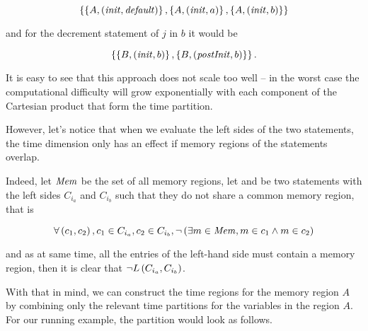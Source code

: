 \documentclass[..thesis.tex]{subfiles}
\begin{document}
\begin{equation*}
\left\lbrace \left\lbrace A, \left( \mathit{init}, \mathit{default} \right) \right\rbrace, \left\lbrace A, \left( \mathit{init}, a  \right) \right\rbrace, \left\lbrace A, \left( \mathit{init}, b \right) \right\rbrace \right\rbrace
\end{equation*}

and for the decrement statement of $j$ in $b$ it would be

\begin{equation*}
\left\lbrace \left\lbrace B, \left( \mathit{init}, b \right)  \right\rbrace, \left\lbrace B, \left( \mathit{postInit}, b \right) \right\rbrace \right\rbrace \text{.}
\end{equation*}


It is easy to see that this approach does not scale too well -- in the worst case the computational difficulty will grow exponentially
with each component of the Cartesian product that form the time partition.

However, let's notice that when we evaluate the left sides of the two statements, the time dimension only has an effect if memory regions of the statements overlap. 

Indeed, let $\mathit{Mem}$ be the set of all memory regions, let  and  be two statements with the left sides $C_{i_{a}}$ and $C_{i_{b}}$ such that they do not share a common memory region, that is

\begin{equation*}
\forall \left( c_1, c_2 \right), c_1 \in C_{i_a} , c_2 \in C_{i_b} , \lnot \left( \exists m \in \mathit{Mem},  m \in c_1 \land m \in c_2 \right)
\end{equation*} 

and as at same time, all the entries of the left-hand side must contain a memory region, then it is clear that $\lnot L \left( C_{i_{a}}, C_{i_{b}} \right) $. 

With that in mind, we can construct the time regions for the memory region $A$ by combining only the relevant time partitions for the variables in the region $A$. 
For our running example, the partition would look as follows.
\end{document}

